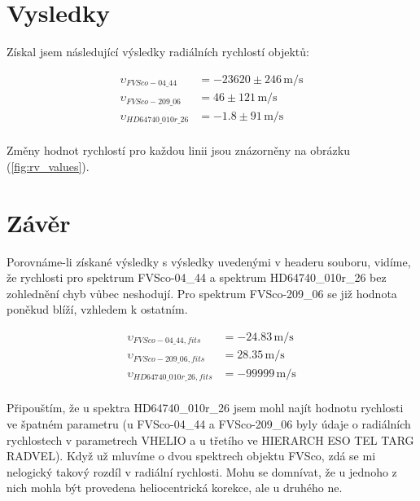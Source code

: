 \documentclass[a4paper,11pt,twocolumn]{article}
\begin{document}
    \section{Vysledky}
        Získal jsem následující výsledky radiálních rychlostí objektů: 

        \begin{equation*}
            \begin{split}
                \upsilon_{FVSco-04\_44} &= -23620 \pm 246 \, \si{\meter\per\second} \\
                \upsilon_{FVSco-209\_06} &= 46 \pm 121 \, \si{\meter\per\second} \\
                \upsilon_{HD64740\_010r\_26} &= -1.8 \pm 91 \, \si{\meter\per\second} \\
            \end{split}
        \end{equation*}

        Změny hodnot rychlostí pro každou linii jsou znázorněny na obrázku (\ref{fig:rv_values}).

        
    \section{Závěr}
        Porovnáme-li získané výsledky s výsledky uvedenými v headeru souboru, vidíme, že rychlosti pro spektrum FVSco-04\_44 a spektrum HD64740\_010r\_26 bez zohlednění chyb vůbec neshodují. Pro spektrum FVSco-209\_06 se již hodnota poněkud blíží, vzhledem k ostatním.
        
        \begin{equation*}
            \begin{split}
                \upsilon_{FVSco-04\_44, fits} &= -24.83 \, \si{\meter\per\second} \\
                \upsilon_{FVSco-209\_06, fits} &= 28.35 \, \si{\meter\per\second} \\
                \upsilon_{HD64740\_010r\_26, fits} &= -99999 \, \si{\meter\per\second} \\
            \end{split}
        \end{equation*}

        Připouštím, že u spektra HD64740\_010r\_26 jsem mohl najít hodnotu rychlosti ve špatném parametru (u FVSco-04\_44 a FVSco-209\_06 byly údaje o radiálních rychlostech v parametrech VHELIO a u třetího ve HIERARCH ESO TEL TARG RADVEL). 
        Když už mluvíme o dvou spektrech objektu FVSco, zdá se mi nelogický takový rozdíl v radiální rychlosti. Mohu se domnívat, že u jednoho z nich mohla být provedena heliocentrická korekce, ale u druhého ne. 
\end{document}
